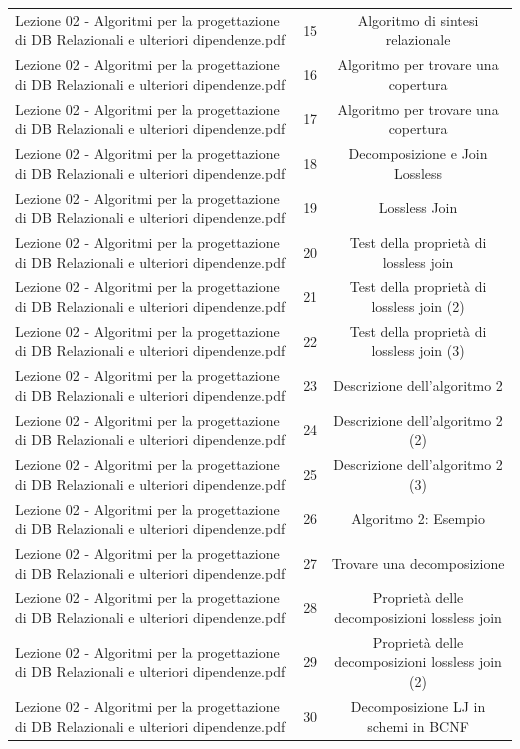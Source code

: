 \documentclass[11pt]{article}
\begin{document}
\begin{longtable}{@{}p{}cc@{}}
Lezione 02 - Algoritmi per la progettazione di DB Relazionali e ulteriori dipendenze.pdf & 15 & Algoritmo di sintesi relazionale \\
Lezione 02 - Algoritmi per la progettazione di DB Relazionali e ulteriori dipendenze.pdf & 16 & Algoritmo per trovare una copertura \\
Lezione 02 - Algoritmi per la progettazione di DB Relazionali e ulteriori dipendenze.pdf & 17 & Algoritmo per trovare una copertura \\
Lezione 02 - Algoritmi per la progettazione di DB Relazionali e ulteriori dipendenze.pdf & 18 & Decomposizione e Join Lossless \\
Lezione 02 - Algoritmi per la progettazione di DB Relazionali e ulteriori dipendenze.pdf & 19 & Lossless Join \\
Lezione 02 - Algoritmi per la progettazione di DB Relazionali e ulteriori dipendenze.pdf & 20 & Test della proprietà di lossless join \\
Lezione 02 - Algoritmi per la progettazione di DB Relazionali e ulteriori dipendenze.pdf & 21 & Test della proprietà di lossless join (2) \\
Lezione 02 - Algoritmi per la progettazione di DB Relazionali e ulteriori dipendenze.pdf & 22 & Test della proprietà di lossless join (3) \\
Lezione 02 - Algoritmi per la progettazione di DB Relazionali e ulteriori dipendenze.pdf & 23 & Descrizione dell'algoritmo 2 \\
Lezione 02 - Algoritmi per la progettazione di DB Relazionali e ulteriori dipendenze.pdf & 24 & Descrizione dell'algoritmo 2 (2) \\
Lezione 02 - Algoritmi per la progettazione di DB Relazionali e ulteriori dipendenze.pdf & 25 & Descrizione dell'algoritmo 2 (3) \\
Lezione 02 - Algoritmi per la progettazione di DB Relazionali e ulteriori dipendenze.pdf & 26 & Algoritmo 2: Esempio \\
Lezione 02 - Algoritmi per la progettazione di DB Relazionali e ulteriori dipendenze.pdf & 27 & Trovare una decomposizione \\
Lezione 02 - Algoritmi per la progettazione di DB Relazionali e ulteriori dipendenze.pdf & 28 & Proprietà delle decomposizioni lossless join \\
Lezione 02 - Algoritmi per la progettazione di DB Relazionali e ulteriori dipendenze.pdf & 29 & Proprietà delle decomposizioni lossless join (2) \\
Lezione 02 - Algoritmi per la progettazione di DB Relazionali e ulteriori dipendenze.pdf & 30 & Decomposizione LJ in schemi in BCNF \\

\end{longtable}
\end{document}
